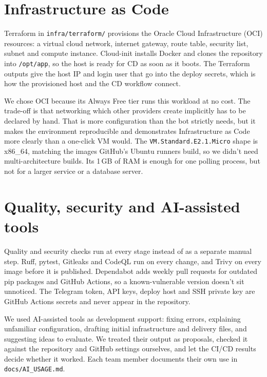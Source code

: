 \documentclass[11pt,a4paper]{article}
\begin{document}
\section{Infrastructure as Code}

Terraform in \texttt{infra/terraform/} provisions the Oracle Cloud Infrastructure (OCI) resources: a virtual cloud network, internet gateway, route table, security list, subnet and compute instance. Cloud-init installs Docker and clones the repository into \texttt{/opt/app}, so the host is ready for CD as soon as it boots. The Terraform outputs give the host IP and login user that go into the deploy secrets, which is how the provisioned host and the CD workflow connect.

We chose OCI because its Always Free tier runs this workload at no cost. The trade-off is that networking which other providers create implicitly has to be declared by hand. That is more configuration than the bot strictly needs, but it makes the environment reproducible and demonstrates Infrastructure as Code more clearly than a one-click VM would. The \texttt{VM.Standard.E2.1.Micro} shape is x86\_64, matching the images GitHub's Ubuntu runners build, so we didn't need multi-architecture builds. Its 1\,GB of RAM is enough for one polling process, but not for a larger service or a database server.

\section{Quality, security and AI-assisted tools}

Quality and security checks run at every stage instead of as a separate manual step. Ruff, pytest, Gitleaks and CodeQL run on every change, and Trivy on every image before it is published. Dependabot adds weekly pull requests for outdated pip packages and GitHub Actions, so a known-vulnerable version doesn't sit unnoticed. The Telegram token, API keys, deploy host and SSH private key are GitHub Actions secrets and never appear in the repository.

We used AI-assisted tools as development support: fixing errors, explaining unfamiliar configuration, drafting initial infrastructure and delivery files, and suggesting ideas to evaluate. We treated their output as proposals, checked it against the repository and GitHub settings ourselves, and let the CI/CD results decide whether it worked. Each team member documents their own use in \texttt{docs/AI\_USAGE.md}.
\end{document}
